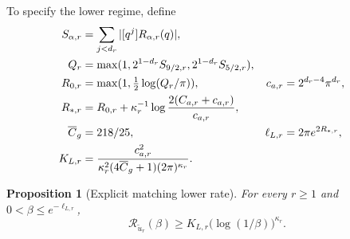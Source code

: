 \documentclass[11pt]{article}
\newtheorem{proposition}[theorem]{Proposition}
\theoremstyle{remark}
\begin{document}
To specify the lower regime, define
\begin{align}
 S_{\alpha,r}&=\sum_{j<d_r}|[q^j]R_{\alpha,r}(q)|,\notag\\
 Q_r&=\max(1,2^{1-d_r}S_{9/2,r},2^{1-d_r}S_{5/2,r}),\notag\\
 R_{0,r}&=\max(1,\tfrac12\log(Q_r/\pi)),&
 c_{a,r}&=2^{d_r-4}\pi^{d_r},\notag\\
 R_{*,r}&=R_{0,r}+\kappa_r^{-1}
                    \log\frac{2(C_{a,r}+c_{a,r})}{c_{a,r}},\notag\\
 \overline C_g&=218/25,&
 \ell_{L,r}&=2\pi e^{2R_{*,r}},\notag\\
 K_{L,r}&=\frac{c_{a,r}^2}
 {\kappa_r^2(4\overline C_g+1)(2\pi)^{\kappa_r}}.\label{lowerconstants}
\end{align}

\begin{proposition}[Explicit matching lower rate]\label{lower}
For every \(r\ge1\) and \(0<\beta\le e^{-\ell_{L,r}}\),
\[
 \mathcal R_{\widetilde u_r}(\beta)
       \ge K_{L,r}\bigl(\log(1/\beta)\bigr)^{\kappa_r}.
\]
\end{proposition}
\end{document}
